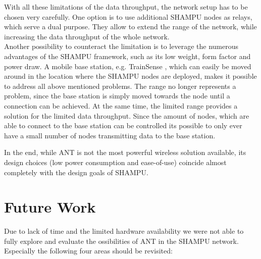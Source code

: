 With all these limitations of the data throughput, the network setup has to be chosen very carefully. One option is to use additional SHAMPU nodes as relays, which serve a dual purpose. They allow to extend the range of the network, while increasing the data throughput of the whole network.\\ Another possibility to counteract the limitation is to leverage the numerous advantages of the SHAMPU framework, such as its low weight, form factor and power draw. A mobile base station, e.g. TrainSense \cite{Smeets:2013:TNI:2450070.2450072}, which can easily be moved around in the location where the SHAMPU nodes are deployed, makes it possible to address all above mentioned problems. The range no longer represents a problem, since the base station is simply moved towards the node until a connection can be achieved. At the same time, the limited range provides a solution for the limited data throughput. Since the amount of nodes, which are able to connect to the base station can be controlled its possible to only ever have a small number of nodes transmitting data to the base station.

In the end, while ANT is not the most powerful wireless solution available, its design choices (low power consumption and ease-of-use) coincide almost completely with the design goals of SHAMPU.
\newpage
\section{Future Work}
\label{sec:future}
Due to lack of time and the limited hardware availability we were not able to fully explore and evaluate the ossibilities of ANT in the SHAMPU network. Especially the following four areas should be revisited:

